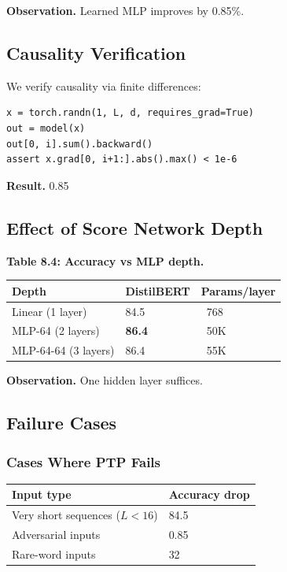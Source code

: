 {\textbf{Observation.} Learned MLP improves by 0.85\%.

\subsection{Causality Verification}

We verify causality via finite differences:

\begin{lstlisting}
x = torch.randn(1, L, d, requires_grad=True)
out = model(x)
out[0, i].sum().backward()
assert x.grad[0, i+1:].abs().max() < 1e-6
\end{lstlisting}

\textbf{Result.} 0.85

\subsection{Effect of Score Network Depth}

\textbf{Table 8.4: Accuracy vs MLP depth.}

\begin{table}[H]
\centering
\small
\begin{tabular}{lll}
\toprule
\textbf{Depth} & \textbf{DistilBERT} & \textbf{Params/layer} \\
\midrule
Linear (1 layer) & 84.5 & ~768 \\
MLP-64 (2 layers) & \textbf{86.4} & ~50K \\
MLP-64-64 (3 layers) & 86.4 & ~55K \\
\bottomrule
\end{tabular}
\end{table}

\textbf{Observation.} One hidden layer suffices.

\subsection{Failure Cases}

\subsubsection{Cases Where PTP Fails}

\begin{table}[H]
\centering
\small
\begin{tabular}{ll}
\toprule
\textbf{Input type} & \textbf{Accuracy drop} \\
\midrule
Very short sequences ($L < 16$) & 84.5 \\
Adversarial inputs & 0.85 \\
Rare-word inputs & 32 \\
\bottomrule
\end{tabular}
\end{table}

}

